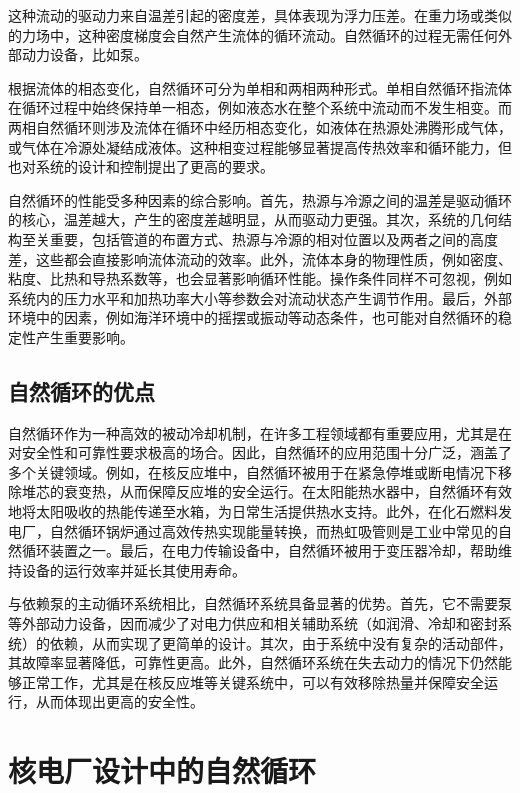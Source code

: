 \documentclass{article}
\begin{document}
这种流动的驱动力来自温差引起的密度差，具体表现为浮力压差。在重力场或类似的力场中，这种密度梯度会自然产生流体的循环流动。自然循环的过程无需任何外部动力设备，比如泵\cite{thakuriaINVESTIGATIONSSUBCRITICALSUPERCRITICAL}。

根据流体的相态变化，自然循环可分为单相和两相两种形式。单相自然循环指流体在循环过程中始终保持单一相态，例如液态水在整个系统中流动而不发生相变。\cite{reventosParametersConcepts2017a}而两相自然循环则涉及流体在循环中经历相态变化，如液体在热源处沸腾形成气体，或气体在冷源处凝结成液体。这种相变过程能够显著提高传热效率和循环能力，但也对系统的设计和控制提出了更高的要求。

自然循环的性能受多种因素的综合影响。首先，热源与冷源之间的温差是驱动循环的核心，温差越大，产生的密度差越明显，从而驱动力更强。其次，系统的几何结构至关重要，包括管道的布置方式、热源与冷源的相对位置以及两者之间的高度差，这些都会直接影响流体流动的效率。此外，流体本身的物理性质，例如密度、粘度、比热和导热系数等，也会显著影响循环性能。操作条件同样不可忽视，例如系统内的压力水平和加热功率大小等参数会对流动状态产生调节作用。最后，外部环境中的因素，例如海洋环境中的摇摆或振动等动态条件，也可能对自然循环的稳定性产生重要影响。\cite{aksanTargetPhenomenaNuclear2017a}

\subsection{自然循环的优点}

自然循环作为一种高效的被动冷却机制，在许多工程领域都有重要应用，尤其是在对安全性和可靠性要求极高的场合。因此，自然循环的应用范围十分广泛，涵盖了多个关键领域。例如，在核反应堆中，自然循环被用于在紧急停堆或断电情况下移除堆芯的衰变热，从而保障反应堆的安全运行。在太阳能热水器中，自然循环有效地将太阳吸收的热能传递至水箱，为日常生活提供热水支持。此外，在化石燃料发电厂，自然循环锅炉通过高效传热实现能量转换，而热虹吸管则是工业中常见的自然循环装置之一。最后，在电力传输设备中，自然循环被用于变压器冷却，帮助维持设备的运行效率并延长其使用寿命。

与依赖泵的主动循环系统相比，自然循环系统具备显著的优势。首先，它不需要泵等外部动力设备，因而减少了对电力供应和相关辅助系统（如润滑、冷却和密封系统）的依赖，从而实现了更简单的设计。其次，由于系统中没有复杂的活动部件，其故障率显著降低，可靠性更高。此外，自然循环系统在失去动力的情况下仍然能够正常工作，尤其是在核反应堆等关键系统中，可以有效移除热量并保障安全运行，从而体现出更高的安全性。

\section{核电厂设计中的自然循环}
\end{document}
